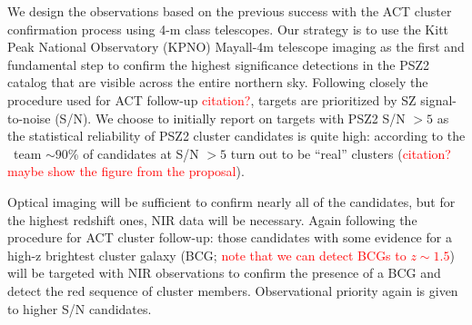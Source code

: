 \documentclass[apj, revtex4-1]{emulateapj}
\newcommand{\editorial}[1]{\textcolor{red}{#1}}
\begin{document}
We design the observations based on the previous success with the ACT cluster confirmation process using 4-m class telescopes. Our strategy is to use the Kitt Peak National Observatory (KPNO) Mayall-4m telescope imaging as the first and fundamental step to confirm the highest significance detections in the PSZ2 catalog that are visible across the entire northern sky. Following closely the procedure used for ACT follow-up \editorial{citation?}, targets are prioritized by SZ signal-to-noise (S/N). We choose to initially report on targets with PSZ2 S/N $>5$ as the statistical reliability of PSZ2 cluster candidates is quite high: according to the \planck\ team $\sim90$\% of candidates at S/N $>5$ turn out to be ``real'' clusters (\editorial{citation? maybe show the figure from the proposal}).

Optical imaging will be sufficient to confirm nearly all of the candidates, but for the highest redshift ones, NIR data will be necessary. Again following the procedure for ACT cluster follow-up: those candidates with some evidence for a high-z brightest cluster galaxy (BCG; \editorial{note that we can detect BCGs to $z \sim 1.5$}) will be targeted with NIR observations to confirm the presence of a BCG and detect the red sequence of cluster members. Observational priority again is given to higher S/N candidates.

\end{document}
